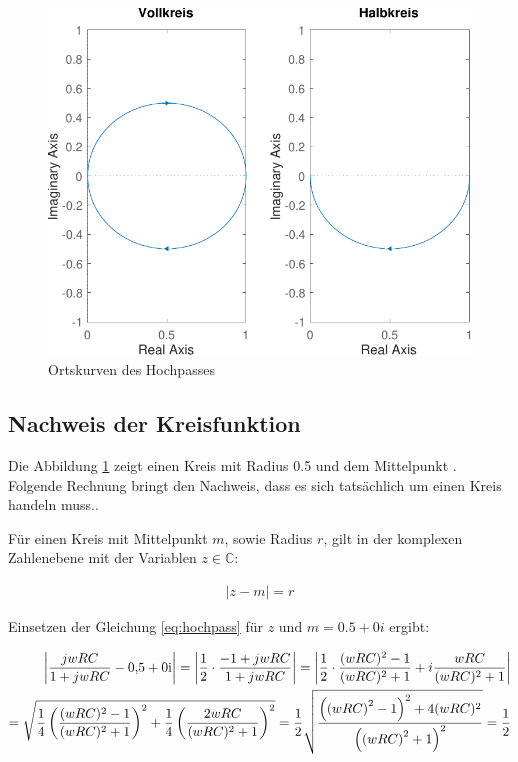 \documentclass[
    paper=a4,
    fontsize=10pt,
    DIV=13,
    oneside,
]{scrartcl}
\begin{document}
    \begin{figure}
        \centering
        \includegraphics[width=\imagewidth]{../versuch1/ortskurve}
        \caption{Ortskurven des Hochpasses}
        \label{fig:ortskurve}
    \end{figure}

    \subsection{Nachweis der Kreisfunktion}

    Die Abbildung \ref{fig:ortskurve} zeigt einen Kreis mit Radius 0.5 und dem Mittelpunkt . Folgende Rechnung bringt den Nachweis, dass es sich tatsächlich um einen Kreis handeln muss..

    Für einen Kreis mit Mittelpunkt \(m\), sowie Radius \(r\), gilt in der komplexen Zahlenebene mit der Variablen \(z \in \mathbb{C}\):
    
    \begin{align}
        \left| z - m \right| = r
    \end{align}

    Einsetzen der Gleichung \eqref{eq:hochpass} für \(z\) und \(m= 0.5 +0i\) ergibt:

    \begin{align}
        \left|\frac{jwRC}{1+jwRC} - \complexnum{0.5 +0i} \right| = \left| \frac{1}{2} \cdot \frac{-1 + jwRC}{1 + jwRC} \right| = \left| \frac{1}{2} \cdot \frac{(wRC)^2 - 1}{(wRC)^2 + 1} + i \frac{wRC}{(wRC)^2 + 1} \right| \\
        = \sqrt{ \frac{1}{4} \left( \frac{(wRC)^2 - 1}{(wRC)^2 + 1} \right)^2 + \frac{1}{4} \left( \frac{2wRC}{(wRC)^2 + 1} \right)^2} = \frac{1}{2} \sqrt{ \frac{ \left(\left(wRC\right)^2 - 1\right)^2 + 4 (wRC)^2 }{\left(\left(wRC\right)^2 + 1\right)^2} } = \frac{1}{2}
    \end{align}
\end{document}

